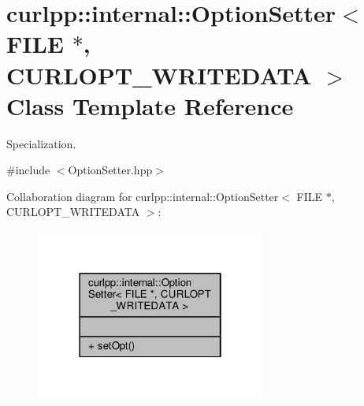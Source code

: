 \hypertarget{classcurlpp_1_1internal_1_1OptionSetter_3_01FILE_01_5_00_01CURLOPT__WRITEDATA_01_4}{\section{curlpp\-:\-:internal\-:\-:Option\-Setter$<$ F\-I\-L\-E $\ast$, C\-U\-R\-L\-O\-P\-T\-\_\-\-W\-R\-I\-T\-E\-D\-A\-T\-A $>$ Class Template Reference}
\label{classcurlpp_1_1internal_1_1OptionSetter_3_01FILE_01_5_00_01CURLOPT__WRITEDATA_01_4}
}


Specialization.  




{\ttfamily \#include $<$Option\-Setter.\-hpp$>$}



Collaboration diagram for curlpp\-:\-:internal\-:\-:Option\-Setter$<$ F\-I\-L\-E $\ast$, C\-U\-R\-L\-O\-P\-T\-\_\-\-W\-R\-I\-T\-E\-D\-A\-T\-A $>$\-:\nopagebreak
\begin{figure}[H]
\begin{center}
\leavevmode
\includegraphics[width=214pt]{classcurlpp_1_1internal_1_1OptionSetter_3_01FILE_01_5_00_01CURLOPT__WRITEDATA_01_4__coll__graph}
\end{center}
\end{figure}
